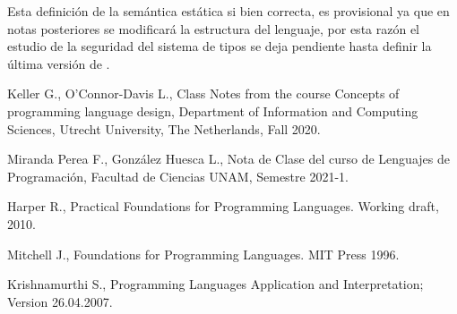 \documentclass[12pt]{extarticle}
\begin{document}
Esta definición de la semántica estática si bien  correcta, es provisional ya que en notas posteriores se modificará la estructura del lenguaje, por esta razón el estudio de la seguridad del sistema de tipos se deja pendiente hasta definir la última versión de \tinyc.



\begin{thebibliography}{9}
Keller G., O'Connor-Davis L., Class Notes from the course Concepts of programming language design, Department of Information and Computing Sciences, Utrecht University, The Netherlands, Fall 2020.

Miranda Perea F., González Huesca L., Nota de Clase del curso de Lenguajes de Programación, Facultad de Ciencias UNAM, Semestre 2021-1.



Harper R., Practical Foundations for Programming Languages. Working draft, 2010.

Mitchell J., Foundations for Programming Languages. MIT Press 1996.

Krishnamurthi S., Programming Languages Application and Interpretation; Version 26.04.2007.



\end{thebibliography}
\end{document}
